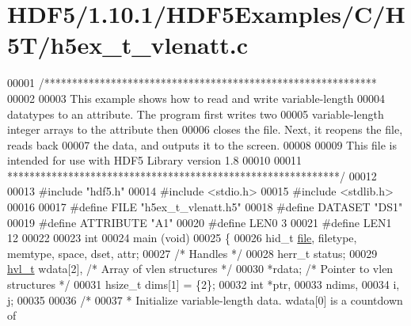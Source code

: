 \hypertarget{_h_d_f5_21_810_81_2_h_d_f5_examples_2_c_2_h5_t_2h5ex__t__vlenatt_8c_source}{}\section{H\+D\+F5/1.10.1/\+H\+D\+F5\+Examples/\+C/\+H5\+T/h5ex\+\_\+t\+\_\+vlenatt.c}
\label{_h_d_f5_21_810_81_2_h_d_f5_examples_2_c_2_h5_t_2h5ex__t__vlenatt_8c_source}

\begin{DoxyCode}
00001 \textcolor{comment}{/************************************************************}
00002 \textcolor{comment}{}
00003 \textcolor{comment}{  This example shows how to read and write variable-length}
00004 \textcolor{comment}{  datatypes to an attribute.  The program first writes two}
00005 \textcolor{comment}{  variable-length integer arrays to the attribute then}
00006 \textcolor{comment}{  closes the file.  Next, it reopens the file, reads back}
00007 \textcolor{comment}{  the data, and outputs it to the screen.}
00008 \textcolor{comment}{}
00009 \textcolor{comment}{  This file is intended for use with HDF5 Library version 1.8}
00010 \textcolor{comment}{}
00011 \textcolor{comment}{ ************************************************************/}
00012 
00013 \textcolor{preprocessor}{#include "hdf5.h"}
00014 \textcolor{preprocessor}{#include <stdio.h>}
00015 \textcolor{preprocessor}{#include <stdlib.h>}
00016 
00017 \textcolor{preprocessor}{#define FILE            "h5ex\_t\_vlenatt.h5"}
00018 \textcolor{preprocessor}{#define DATASET         "DS1"}
00019 \textcolor{preprocessor}{#define ATTRIBUTE       "A1"}
00020 \textcolor{preprocessor}{#define LEN0            3}
00021 \textcolor{preprocessor}{#define LEN1            12}
00022 
00023 \textcolor{keywordtype}{int}
00024 main (\textcolor{keywordtype}{void})
00025 \{
00026     hid\_t       \hyperlink{structfile}{file}, filetype, memtype, space, dset, attr;
00027                                     \textcolor{comment}{/* Handles */}
00028     herr\_t      status;
00029     \hyperlink{structhvl__t}{hvl\_t}       wdata[2],           \textcolor{comment}{/* Array of vlen structures */}
00030                 *rdata;             \textcolor{comment}{/* Pointer to vlen structures */}
00031     hsize\_t     dims[1] = \{2\};
00032     \textcolor{keywordtype}{int}         *ptr,
00033                 ndims,
00034                 i, j;
00035 
00036     \textcolor{comment}{/*}
00037 \textcolor{comment}{     * Initialize variable-length data.  wdata[0] is a countdown of}

\end{DoxyCode}
